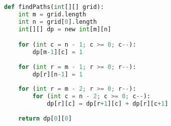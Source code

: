 \documentclass[preview]{standalone}
\begin{document}
\begin{center}
\begin{lstlisting}[language=Python]
def findPaths(int[][] grid):
    int m = grid.length
    int n = grid[0].length
    int[][] dp = new int[m][n]

    for (int c = n - 1; c >= 0; c--):
        dp[m-1][c] = 1
    
    for (int r = m - 1; r >= 0; r--):
        dp[r][n-1] = 1
    
    for (int r = m - 2; r >= 0; r--):
        for (int c = n - 2; c >= 0; c--):
            dp[r][c] = dp[r+1][c] + dp[r][c+1]
    
    return dp[0][0]
\end{lstlisting}
\end{center}
\end{document}
